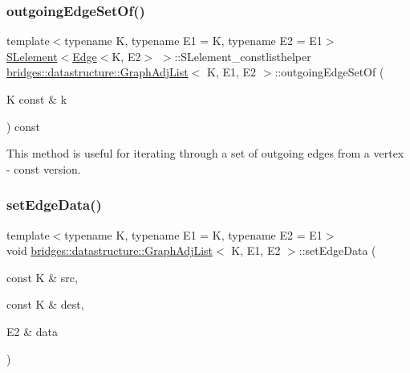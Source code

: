 \subsubsection{\texorpdfstring{outgoing\+Edge\+Set\+Of()}{outgoingEdgeSetOf()}\hspace{0.1cm}{\footnotesize\ttfamily [2/2]}}
{\footnotesize\ttfamily template$<$typename K, typename E1 = K, typename E2 = E1$>$ \\
\hyperlink{classbridges_1_1datastructure_1_1_s_lelement}{S\+Lelement}$<$\hyperlink{classbridges_1_1datastructure_1_1_edge}{Edge}$<$K, E2$>$ $>$\+::S\+Lelement\+\_\+constlisthelper \hyperlink{classbridges_1_1datastructure_1_1_graph_adj_list}{bridges\+::datastructure\+::\+Graph\+Adj\+List}$<$ K, E1, E2 $>$\+::outgoing\+Edge\+Set\+Of (\begin{DoxyParamCaption}\item[{K const \&}]{k }\end{DoxyParamCaption}) const\hspace{0.3cm}{\ttfamily [inline]}}



This method is useful for iterating through a set of outgoing edges from a vertex -\/ const version. 

\mbox{\label{classbridges_1_1datastructure_1_1_graph_adj_list_a21a7e957d60e18b540dc778b1d569372}} 
\subsubsection{\texorpdfstring{set\+Edge\+Data()}{setEdgeData()}}
{\footnotesize\ttfamily template$<$typename K, typename E1 = K, typename E2 = E1$>$ \\
void \hyperlink{classbridges_1_1datastructure_1_1_graph_adj_list}{bridges\+::datastructure\+::\+Graph\+Adj\+List}$<$ K, E1, E2 $>$\+::set\+Edge\+Data (\begin{DoxyParamCaption}\item[{const K \&}]{src,  }\item[{const K \&}]{dest,  }\item[{E2 \&}]{data }\end{DoxyParamCaption})\hspace{0.3cm}{\ttfamily [inline]}}



